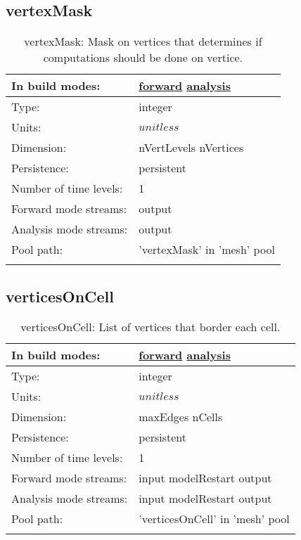 \subsection[vertexMask]{vertexMask}
\label{subsec:var_sec_mesh_vertexMask}
\begin{center}
\begin{longtable}{| p{2.0in} | p{4.0in} |}
        \hline 
        In build modes: & \hyperref[subsec:forward_var_tab_mesh]{forward} \hyperref[subsec:analysis_var_tab_mesh]{analysis} \\
        \hline 
        Type: & integer \\
        \hline 
        Units: & $unitless$ \\
        \hline 
        Dimension: & nVertLevels nVertices \\
        \hline 
        Persistence: & persistent \\
        \hline 
        Number of time levels: & 1 \\
        \hline 
		 Forward mode streams: &  output \\
        \hline 
		 Analysis mode streams: &  output \\
        \hline 
            Pool path: & 'vertexMask' in 'mesh' pool
 \\
		 \hline 
    \caption{vertexMask: Mask on vertices that determines if computations should be done on vertice.}
\end{longtable}
\end{center}
\subsection[verticesOnCell]{verticesOnCell}
\label{subsec:var_sec_mesh_verticesOnCell}
\begin{center}
\begin{longtable}{| p{2.0in} | p{4.0in} |}
        \hline 
        In build modes: & \hyperref[subsec:forward_var_tab_mesh]{forward} \hyperref[subsec:analysis_var_tab_mesh]{analysis} \\
        \hline 
        Type: & integer \\
        \hline 
        Units: & $unitless$ \\
        \hline 
        Dimension: & maxEdges nCells \\
        \hline 
        Persistence: & persistent \\
        \hline 
        Number of time levels: & 1 \\
        \hline 
		 Forward mode streams: &  input modelRestart output \\
        \hline 
		 Analysis mode streams: &  input modelRestart output \\
        \hline 
            Pool path: & 'verticesOnCell' in 'mesh' pool
 \\
		 \hline 
    \caption{verticesOnCell: List of vertices that border each cell.}
\end{longtable}
\end{center}
